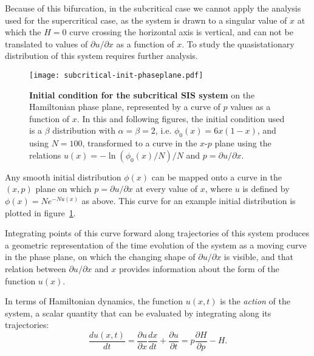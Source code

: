\documentclass[review]{elsarticle}
\begin{document}
Because of this bifurcation,
in the subcritical case
we cannot apply the analysis used for the supercritical case,
as the system is drawn to a singular value of $x$ at which the
$H=0$ curve crossing the horizontal axis is vertical, and can not be
translated to values of ${\partial u}/{\partial x}$ as a function
of $x$.
To study the quasistationary distribution of this system
requires further analysis.

\begin{figure}
\centering
\texttt{[image: subcritical-init-phaseplane.pdf]}
\caption{ \label{fig:initial-u}
{\bf Initial condition for the subcritical SIS system} on
the Hamiltonian phase plane,
represented by a curve of $p$ values as a function of $x$.
In this and following figures, the initial condition used is
a $\beta$ distribution with $\alpha=\beta=2$, i.e.
$\phi_0(x)=6x(1-x)$, and using $N=100$,
transformed to a curve in the $x$-$p$ plane
using the relations $u(x)=-\ln({\phi_0(x)}/N)/N$
and $p=\partial u/\partial x$.
}
\end{figure}

Any smooth initial distribution $\phi(x)$ can be mapped onto a curve
in the $(x,p)$ plane
on which $p={\partial u}/{\partial x}$ at every value of $x$,
where $u$ is defined by $\phi(x) = Ne^{-Nu(x)}$ as above.
This curve for an example initial distribution is
plotted in figure~\ref{fig:initial-u}.

Integrating points of this curve
forward along trajectories of this system produces a geometric
representation of the time
evolution of the system as a moving curve in the phase plane,
on which the changing shape of ${\partial u}/{\partial x}$
is visible, and 
that relation between $\partial u/\partial x$ and $x$
provides information about the form of the function $u(x)$.

In terms of Hamiltonian dynamics, the function $u(x,t)$
is the \emph{action} of the system,
a scalar quantity that can be evaluated by integrating along its trajectories:
\begin{dmath*}
\frac{du(x,t)}{dt} = \frac{\partial u}{\partial x}\frac{dx}{dt} + \frac{\partial u}{\partial t}
 = p \frac{\partial H}{\partial p} - H.
\end{dmath*}
\end{document}
